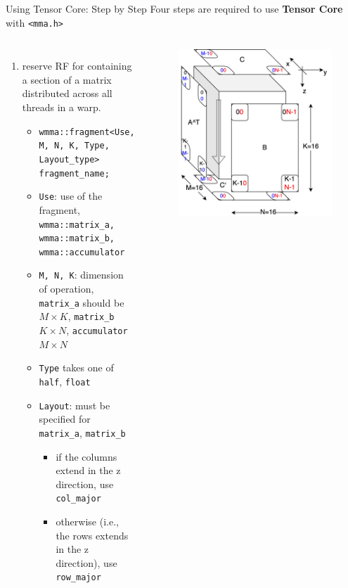 \documentclass[dvipdfmx, 11pt, aspectratio=169]{beamer}   %
\begin{document}
\begin{frame}[fragile]{Using Tensor Core: Step by Step}
Four steps are required to use \textbf{Tensor Core} with \lstinline|<mma.h>|
\begin{columns}
\begin{enumerate}
  \item reserve RF for containing a section of a matrix distributed across all threads in a warp.
  \begin{itemize}
    \item \lstinline|wmma::fragment<Use, M, N, K, Type, Layout_type> fragment_name;|
    \item \lstinline|Use|: use of the fragment, \lstinline|wmma::matrix_a, wmma::matrix_b, wmma::accumulator|
    \item \lstinline|M, N, K|: dimension of operation, \lstinline|matrix_a| should be $M\times K$, \lstinline|matrix_b| $K\times N$, \lstinline|accumulator| $M\times N$
    \item \lstinline|Type| takes one of \lstinline|half|, \lstinline|float|
    \item \lstinline|Layout|: must be specified for \lstinline|matrix_a|, \lstinline|matrix_b|
    \begin{itemize}
      \item if the columns extend in the z direction, use \lstinline|col_major|
      \item otherwise (i.e., the rows extends in the z direction), use \lstinline|row_major|
    \end{itemize}
  \end{itemize}
\end{enumerate}
\vspace{-2\baselineskip}
\begin{figure}
  \includegraphics[scale=0.1]{img/mma_warp.png}

\end{figure}
\end{columns}
\end{frame}
\end{document}
